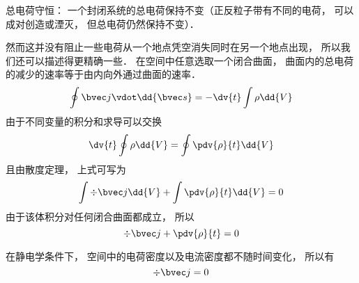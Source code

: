 
总电荷守恒： 一个封闭系统的总电荷保持不变（正反粒子带有不同的电荷， 可以成对创造或湮灭， 但总电荷仍然保持不变）．

然而这并没有阻止一些电荷从一个地点凭空消失同时在另一个地点出现， 所以我们还可以描述得更精确一些． 在空间中任意选取一个闭合曲面， 曲面内的总电荷的减少的速率等于由内向外通过曲面的速率．
\begin{equation}
\oint \bvec j \vdot \dd{\bvec s}  =  - \dv{t} \int \rho \dd{V}
\end{equation} 
由于不同变量的积分和求导可以交换%
\begin{equation}
\dv{t} \oint \rho  \dd{V}  = \oint \pdv{\rho}{t} \dd{V}
\end{equation}
且由散度定理， 上式可写为
\begin{equation}
\int \div \bvec j \dd{V}  + \int \pdv{\rho}{t} \dd{V}  = 0
\end{equation} 
由于该体积分对任何闭合曲面都成立， 所以
\begin{equation}\label{ChgCsv_eq4}
\div \bvec j + \pdv{\rho}{t} = 0
\end{equation}

在静电学条件下， 空间中的电荷密度以及电流密度都不随时间变化， 所以有
\begin{equation}
\div \bvec j = 0
\end{equation}
